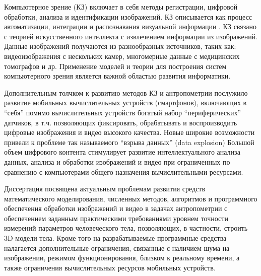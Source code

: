 Компьютерное зрение (КЗ) включает в себя методы регистрации, цифровой обработки, анализа и идентификации изображений. КЗ описывается как процесс автоматизации, интеграции и распознавания визуальной информации \cite{Wang2016,Maria2016,Ioan2011,Lauren2013,Saha2005,Azriel2001}. КЗ связано с теорией искусственного интеллекта с извлечением информации из изображений. Данные изображений получаются из разнообразных источников, таких как: видеоизображения с нескольких камер, многомерные данные с медицинских томографов и др. Применение моделей и теории для построения систем компьютерного зрения является важной областью развития информатики.

Дополнительным толчком к развитию методов КЗ и антропометрии послужило развитие мобильных вычислительных устройств (смартфонов), включающих в ``себя'' помимо вычислительных устройств  богатый набор ``периферических'' датчиков, в т.ч. позволяющих фиксировать, обрабатывать и воспроизводить цифровые изображения и видео высокого качества.  Новые широкие возможности привели к проблеме так называемого ``взрыва данных'' (data explosion)   Большой объем цифрового контента стимулирует развитие интеллектуального анализа данных, анализа и обработки изображений и видео при ограниченных по сравнению с компьютерами общего назначения вычислительными ресурсами.

Диссертация посвящена актуальным проблемам развития средств математического моделирования, численных методов, алгоритмов и программного обеспечения обработки изображений и видео в задачах антропометрии с обеспечением заданным практическими требованиями уровнем точности измерений параметров человеческого тела, позволяющих, в частности, строить 3D-модели тела.  Кроме того на разрабатываемые программные средства налагается дополнительные ограничения, связанные с наличием шума на изображении, режимом функционирования, близком к реальному времени, а также ограничения вычислительных ресурсов мобильных устройств.

